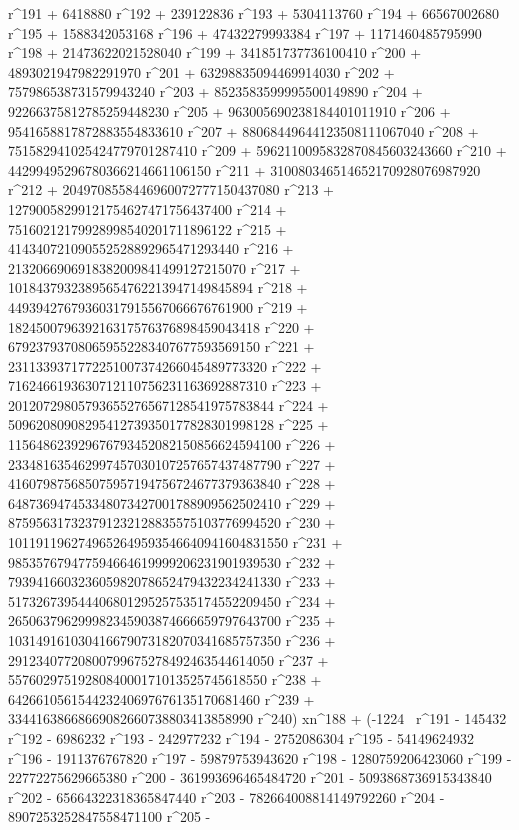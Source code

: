 r^191 + 6418880 r^192 + 239122836 r^193 + 5304113760 r^194 + 
       66567002680 r^195 + 1588342053168 r^196 + 
       47432279993384 r^197 + 1171460485795990 r^198 + 
       21473622021528040 r^199 + 341851737736100410 r^200 + 
       4893021947982291970 r^201 + 63298835094469914030 r^202 + 
       757986538731579943240 r^203 + 8523583599995500149890 r^204 + 
       92266375812785259448230 r^205 + 
       963005690238184401011910 r^206 + 
       9541658817872883554833610 r^207 + 
       88068449644123508111067040 r^208 + 
       751582941025424779701287410 r^209 + 
       5962110095832870845603243660 r^210 + 
       44299495296780366214661106150 r^211 + 
       310080346514652170928076987920 r^212 + 
       2049708558446960072777150437080 r^213 + 
       12790058299121754627471756437400 r^214 + 
       75160212179928998540201711896122 r^215 + 
       414340721090552528892965471293440 r^216 + 
       2132066906918382009841499127215070 r^217 + 
       10184379323895654762213947149845894 r^218 + 
       44939427679360317915567066676761900 r^219 + 
       182450079639216317576376898459043418 r^220 + 
       679237937080659552283407677593569150 r^221 + 
       2311339371772251007374266045489773320 r^222 + 
       7162466193630712110756231163692887310 r^223 + 
       20120729805793655276567128541975783844 r^224 + 
       50962080908295412739350177828301998128 r^225 + 
       115648623929676793452082150856624594100 r^226 + 
       233481635462997457030107257657437487790 r^227 + 
       416079875685075957194756724677379363840 r^228 + 
       648736947453348073427001788909562502410 r^229 + 
       875956317323791232128835575103776994520 r^230 + 
       1011911962749652649593546640941604831550 r^231 + 
       985357679477594664619999206231901939530 r^232 + 
       793941660323605982078652479432234241330 r^233 + 
       517326739544406801295257535174552209450 r^234 + 
       265063796299982345903874666659797643700 r^235 + 
       103149161030416679073182070341685757350 r^236 + 
       29123407720800799675278492463544614050 r^237 + 
       5576029751928084000171013525745618550 r^238 + 
       642661056154423240697676135170681460 r^239 + 
       33441638668669082660738803413858990 r^240) xn^188 + (-1224 \
r^191 - 145432 r^192 - 6986232 r^193 - 242977232 r^194 - 
       2752086304 r^195 - 54149624932 r^196 - 1911376767820 r^197 - 
       59879753943620 r^198 - 1280759206423060 r^199 - 
       22772275629665380 r^200 - 361993696465484720 r^201 - 
       5093868736915343840 r^202 - 65664322318365847440 r^203 - 
       782664008814149792260 r^204 - 8907253252847558471100 r^205 - 

